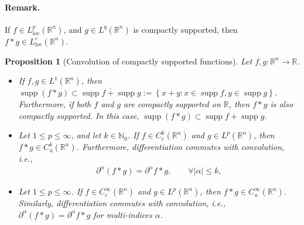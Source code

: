 \documentclass{article}
\numberwithin{equation}{section}
\newcommand{\bbR}{\mathbb{R}}
\newcommand{\loc}{\mathrm{loc}}
\DeclareMathOperator{\supp}{supp}
\theoremstyle{plain}
\newtheorem{proposition}[theorem]{Proposition}
\theoremstyle{definition}
\begin{document}
\paragraph{Remark.} If $f\in L^p_\loc(\bbR^n)$, and $g\in L^q(\bbR^n)$ is compactly supported, then $f*g\in L^r_\loc(\bbR^n)$.

\begin{proposition}[Convolution of compactly supported functions]\label{prop:1.4}
	Let $f,g:\mathbb{R}^n\to\mathbb{R}$.
	\begin{itemize}
		\item[(i)] If $f,g\in L^1(\mathbb{R}^n)$, then $\supp(f*g)\subset\overline{\supp f + \supp g} := \overline{\left\{x+y:x\in\supp f,y\in\supp g\right\}}$. Furthermore, if both $f$ and $g$ are compactly supported on $\mathbb{R}$, then $f*g$ is also compactly supported. In this case, $\supp(f*g)\subset\supp f + \supp g$.
		\vspace{0.1cm}
		\item[(ii)] Let $1\leq p\leq \infty$, and let $k\in\mathbb{N}_0$. If $f\in C_c^k(\mathbb{R}^n)$ and $g\in L^p(\mathbb{R}^n)$, then $f * g\in C^k_u(\mathbb{R}^n)$. Furthermore, differentiation commutes with convolution, i.e.,
		\begin{align*}
			\partial^\alpha(f*g)=\partial^\alpha f * g,\qquad\forall\vert\alpha\vert\leq k,
		\end{align*}
		\item[(iii)] Let $1\leq p\leq \infty$. If $f\in C_c^\infty(\mathbb{R}^n)$ and $g\in L^p(\mathbb{R}^n)$, then $f * g\in C_u^\infty(\mathbb{R}^n)$. Similarly, differentiation commutes with convolution, i.e., $\partial^\alpha(f * g)=\partial^\alpha f * g$ for multi-indices $\alpha$.
	\end{itemize}
\end{proposition}
\end{document}
